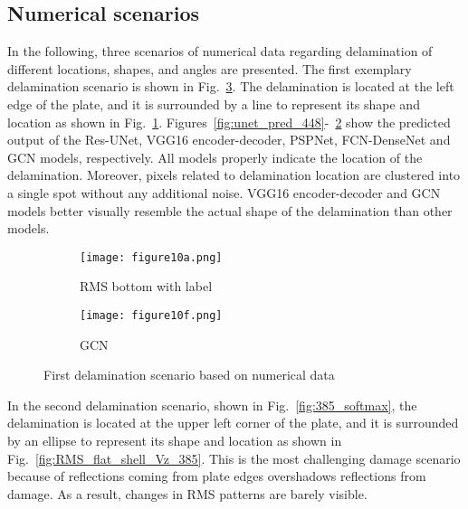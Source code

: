 \documentclass[runningheads]{llncs}
\begin{document}
\subsection{Numerical scenarios}
In the following, three scenarios of numerical data regarding delamination of different locations, shapes, and angles are presented. 
The first exemplary delamination scenario is shown in Fig.~\ref{fig:softmax_448}. 
The delamination is located at the left edge of the plate, and it is surrounded by a line to represent its shape and location as shown in Fig.~\ref{fig:RMS_flat_shell_Vz_448}.
Figures~\ref{fig:unet_pred_448}-~\ref{fig:gcn_pred_448} show the predicted output of the Res-UNet, VGG16 encoder-decoder, PSPNet, FCN-DenseNet and GCN models, respectively. 
All models properly indicate the location of the delamination. 
Moreover, pixels related to delamination location are clustered into a single spot without any additional noise. 
VGG16 encoder-decoder and GCN models better visually resemble the actual shape of the delamination than other models.
\begin{figure}[!ht]
	\centering
	\begin{subfigure}[b]{0.47\textwidth}
		\centering
		\texttt{[image: figure10a.png]}
		\caption{RMS bottom with label}
		\label{fig:RMS_flat_shell_Vz_448}
	\end{subfigure}
	\begin{subfigure}[b]{0.47\textwidth}
		\centering
		\texttt{[image: figure10f.png]}
		\caption{GCN}
		\label{fig:gcn_pred_448}
	\end{subfigure}
	\caption{First delamination scenario based on numerical data}
	\label{fig:softmax_448}
\end{figure} 
In the second delamination scenario, shown in Fig.~\ref{fig:385_softmax}, the delamination is located at the upper left corner of the plate, and it is surrounded by an ellipse to represent its shape and location as shown in Fig.~\ref{fig:RMS_flat_shell_Vz_385}.
This is the most challenging damage scenario because of reflections coming from plate edges overshadows reflections from damage.
As a result, changes in RMS patterns are barely visible.
\end{document}
